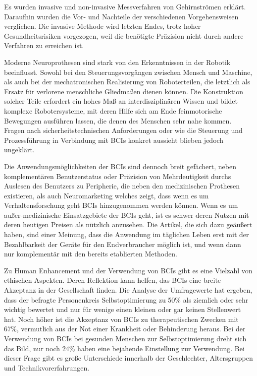 \documentclass[11pt,ngerman,parskip=half]{scrartcl}
\begin{document}
Es wurden invasive und non-invasive Messverfahren von Gehirnströmen erklärt.
Daraufhin wurden die Vor- und Nachteile der verschiedenen Vorgehensweisen
verglichen. Die invasive Methode wird letzten Endes, trotz hoher
Gesundheitsrisiken vorgezogen, weil die benötigte Präzision nicht durch
andere Verfahren zu erreichen ist.

Moderne Neuroprothesen sind stark von den Erkenntnissen in der Robotik
beeinflusst. Sowohl bei den Steuerungsvorgängen zwischen Mensch und Maschine,
als auch bei der mechatronischen Realisierung von Roboterteilen, die
letztlich als Ersatz für verlorene menschliche Gliedmaßen dienen können. Die
Konstruktion solcher Teile erfordert ein hohes Maß an interdisziplinären
Wissen und bildet komplexe Robotersysteme, mit deren Hilfe sich am Ende
feinmotorische Bewegungen ausführen lassen, die denen des Menschen sehr nahe
kommen. Fragen nach sicherheitstechnischen Anforderungen oder wie die
Steuerung und Prozessführung in Verbindung mit BCIs konkret aussieht blieben
jedoch ungeklärt.

Die Anwendungsmöglichkeiten der BCIs sind dennoch breit gefächert, neben
komplementären Benutzerstatus oder Präzision von Mehrdeutigkeit durchs
Auslesen des Benutzers zu Peripherie, die neben den medizinischen Prothesen
existieren, als auch Neuromarketing welches zeigt, dass wenn es um
Verhaltensforschung geht BCIs hinzugenommen werden können. Wenn es um
außer-medizinische Einsatzgebiete der BCIs geht, ist es schwer deren Nutzen
mit deren heutigen Preisen als nützlich anzusehen. Die Artikel, die sich dazu
geäußert haben, sind einer Meinung, dass die Anwendung im täglichen Leben
erst mit der Bezahlbarkeit der Geräte für den Endverbraucher möglich ist, und
wenn dann nur komplementär mit den bereits etablierten Methoden.

Zu Human Enhancement und der Verwendung von BCIs gibt es eine Vielzahl von
ethischen Aspekten. Deren Reflektion kann helfen, das BCIs eine breite
Akzeptanz in der Gesellschaft finden. Die Analyse der Umfragewerte hat
ergeben, dass der befragte Personenkreis Selbstoptimierung zu 50\% als
ziemlich oder sehr wichtig bewertet und nur für wenige einen kleinen oder gar
keinen Stellenwert hat. Noch höher ist die Akzeptanz von BCIs zu
therapeutischen Zwecken mit 67\%, vermutlich aus der Not einer Krankheit oder
Behinderung heraus. Bei der Verwendung von BCIs bei gesunden Menschen zur
Selbstoptimierung dreht sich das Bild, nur noch 24\% haben eine bejahende
Einstellung zur Verwendung. Bei dieser Frage gibt es große Unterschiede
innerhalb der Geschlechter, Altersgruppen und Technikvorerfahrungen.
\end{document}
